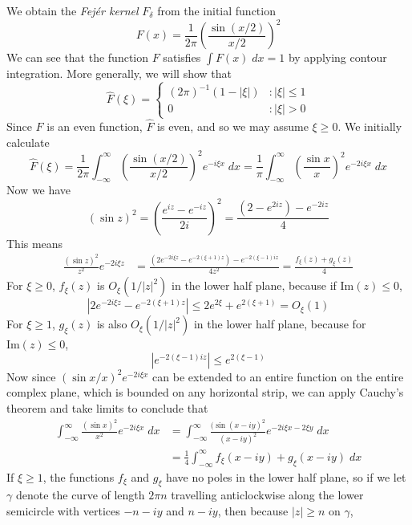 \begin{example}
	We obtain the {\it Fej\'{e}r kernel} $F_\delta$ from the initial function
	\[ F(x) = \frac{1}{2\pi} \left( \frac{\sin(x/2)}{x/2} \right)^2 \]
	We can see that the function $F$ satisfies $\int F(x)\; dx = 1$ by applying contour integration. More generally, we will show that
	\[ \widehat{F}(\xi) = \begin{cases} (2\pi)^{-1} (1 - |\xi|) & : |\xi| \leq 1\\ 0 &: |\xi| > 0 \end{cases} \]
	Since $F$ is an even function, $\widehat{F}$ is even, and so we may assume $\xi \geq 0$. We initially calculate
	\[ \widehat{F}(\xi) = \frac{1}{2\pi} \int_{-\infty}^\infty \left( \frac{\sin(x/2)}{x/2} \right)^2 e^{- i \xi x}\; dx = \frac{1}{\pi} \int_{-\infty}^\infty \left( \frac{\sin x}{x} \right)^2 e^{- 2 i \xi x}\; dx \]
	Now we have
	\[ (\sin z)^2 = \left( \frac{e^{iz} - e^{-iz}}{2i} \right)^2 = \frac{(2 - e^{2iz}) - e^{-2iz}}{4} \]
	This means
	\begin{align*}
		\frac{(\sin z)^2}{z^2} e^{- 2 i \xi z} &= \frac{(2e^{-2 i \xi z} - e^{-2(\xi + 1) z}) - e^{-2(\xi - 1)iz}}{4z^2 } = \frac{f_\xi(z) + g_\xi(z)}{4}
	\end{align*}
	For $\xi \geq 0$, $f_\xi(z)$ is $O_\xi(1/|z|^2)$ in the lower half plane, because if $\text{Im}(z) \leq 0$,
	\[ |2e^{-2 i \xi z} - e^{-2(\xi + 1) z}| \leq 2e^{2 \xi} + e^{2(\xi + 1)} = O_\xi(1) \]
	For $\xi \geq 1$, $g_\xi(z)$ is also $O_\xi(1/|z|^2)$ in the lower half plane, because for $\text{Im}(z) \leq 0$,
	\[ |e^{-2(\xi - 1)iz}| \leq e^{2(\xi - 1)}  \]
	Now since $(\sin x/x)^2 e^{-2 i \xi x}$ can be extended to an entire function on the entire complex plane, which is bounded on any horizontal strip, we can apply Cauchy's theorem and take limits to conclude that
	\begin{align*}
		\int_{-\infty}^\infty \frac{(\sin x)^2}{x^2} e^{-2 i \xi x}\; dx &= \int_{-\infty}^{\infty} \frac{(\sin (x - iy)^2}{(x - iy)^2} e^{-2i \xi x  -2 \xi y}\; dx\\
		&= \frac{1}{4} \int_{-\infty}^\infty f_\xi(x - iy) + g_\xi(x - iy)\; dx
	\end{align*}
	If $\xi \geq 1$, the functions $f_\xi$ and $g_\xi$ have no poles in the lower half plane, so if we let $\gamma$ denote the curve of length $2 \pi n$ travelling anticlockwise along the lower semicircle with vertices $-n - iy$ and $n - iy$, then because $|z| \geq n$ on $\gamma$,
	\begin{align*}

\end{align*}
\end{example}
